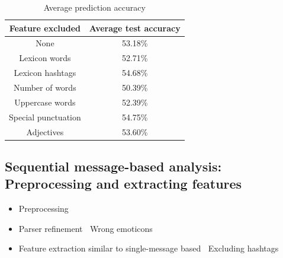 \documentclass[
paper=128mm:96mm, %
fontsize=11pt, %
pagesize, %
parskip=half-, %
]{scrartcl} %
\newcommand{\red}[1]{\textit{\color{red}{#1}}}
\theoremstyle{mythmstyle} %
\begin{document}
\begin{table}[h]
\centering
\begin{tabular}{c c}
\toprule
\textbf{Feature excluded} & \textbf{Average test accuracy} \\
\midrule
None & 53.18\%\\
Lexicon words & 52.71\%\\
Lexicon hashtags & 54.68\%\\
Number of words & 50.39\%\\
Uppercase words & 52.39\%\\
Special punctuation & 54.75\%\\
Adjectives & 53.60\%\\
\bottomrule 
\end{tabular}
\caption{Average prediction accuracy}
\end{table}



\clearpage


\subsection*{Sequential message-based analysis: Preprocessing and extracting features}

\begin{itemize}
\item Preprocessing
\item Parser refinement
\subitem \textbullet $\:$ Wrong emoticons

\item Feature extraction similar to single-message based
\subitem \textbullet $\:$ Excluding hashtags

\end{itemize}

\clearpage
\end{document}
